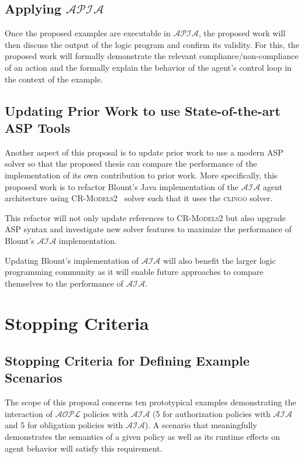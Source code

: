 \subsection{Applying $\mathcal{APIA}$}

Once the proposed examples are executable in $\mathcal{APIA}$, the proposed work will then discuss the output of the logic program and confirm its validity.
For this, the proposed work will formally demonstrate the relevant compliance/non-compliance of an action and the formally explain the behavior of the agent's control loop in the context of the example.

\subsection{Updating Prior Work to use State-of-the-art ASP Tools}

Another aspect of this proposal is to update prior work to use a modern ASP solver so that the proposed thesis can compare the performance of the implementation of its own contribution to prior work.
More specifically, this proposed work is to refactor Blount's Java implementation of the $\mathcal{AIA}$ agent architecture using \textsc{CR-Models2}~\citep{balduccini_cr-models_2007} solver such that it uses the \textsc{clingo} solver.

This refactor will not only update references to \textsc{CR-Models2} but also upgrade ASP syntax and investigate new solver features to maximize the performance of Blount's $\mathcal{AIA}$ implementation.

Updating Blount's implementation of $\mathcal{AIA}$ will also benefit the larger logic programming community as it will enable future approaches to compare themselves to the performance of $\mathcal{AIA}$.

\section{Stopping Criteria}

\subsection{Stopping Criteria for Defining Example Scenarios}

The scope of this proposal concerns ten prototypical examples demonstrating the interaction of $\mathcal{AOPL}$ policies with $\mathcal{AIA}$ (5 for authorization policies with $\mathcal{AIA}$ and 5 for obligation policies with $\mathcal{AIA}$).
A scenario that meaningfully demonstrates the semantics of a given policy as well as its runtime effects on agent behavior will satisfy this requirement.

